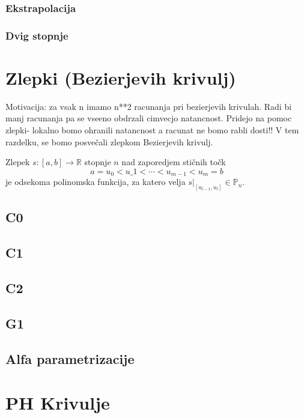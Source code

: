 \documentclass[isrm2, tisk]{fmfdelo}
\newcommand{\R}{\mathbb R}
\newcommand{\Pn}{\mathbb P_n}
\begin{document}
    \subsubsection{Ekstrapolacija}

    \subsubsection{Dvig stopnje}


    \section{Zlepki (Bezierjevih krivulj)}
    Motivacija: za vsak n imamo n**2 racunanja pri bezierjevih krivulah. Radi bi manj racunanja pa se vseeno obdrzali cimvecjo natancnost. Pridejo na pomoc zlepki- lokalno bomo ohranili natancnost a racunat ne bomo rabli dosti!!
    V tem razdelku, se bomo posvečali zlepkom Bezierjevih krivulj.

    \begin{definicija}
        Zlepek $s:[a,b]\to \R $  stopnje $n$ nad zaporedjem stičnih točk \[a=u_0 < u\_1 < \cdots < u_{m-1} < u_m = b\]
        je odsekoma polinomska funkcija, za katero velja $s|_{[u_{l-1},u_l]} \in \Pn$.
    \end{definicija}

    \subsection{C0}

    \subsection{C1}

    \subsection{C2}

    \subsection{G1}

    \subsection{Alfa parametrizacije}


    \section{PH Krivulje}
\end{document}
